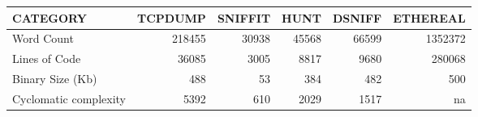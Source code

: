 \begin{tabular}{|p{3.5cm}|r|r|r|r|r|}\hline
CATEGORY                &TCPDUMP & SNIFFIT & HUNT  & DSNIFF  & ETHEREAL \\ \hline\hline

Word Count              
& 218455 & 30938   & 45568 & 66599   & 1352372  \\ \hline

Lines of Code           
& 36085  & 3005    & 8817  & 9680    & 280068   \\ \hline

Binary Size (Kb)
& 488    & 53      & 384   & 482     & 500      \\ \hline

Cyclomatic complexity 
& 5392   &610      & 2029  & 1517    & na         \\ \hline

\end{tabular}


